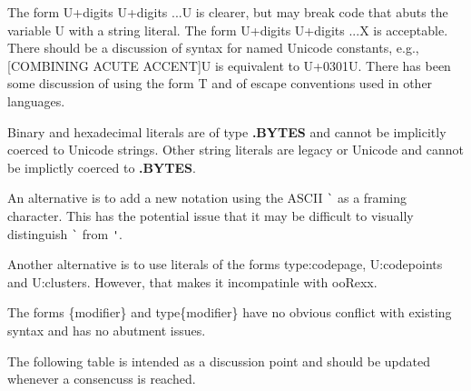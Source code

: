 \documentclass[b4paper]{article}
\begin{document}
The form {\textquotesingle}U+digits U+digits ...{\textquotesingle}U is clearer,
but may break code that abuts the variable U with a string literal.
The form {\textquotesingle}U+digits U+digits ...{\textquotesingle}X is acceptable.
There should be a discussion of syntax for named Unicode constants, e.g.,
{\textquotesingle}[COMBINING ACUTE ACCENT]{\textquotesingle}U is
equivalent to {\textquotesingle}U+0301{\textquotesingle}U.
There has been some discussion of using the form
{\textquotesingle}\textellipsis{\textquotesingle}T and of escape conventions
used in other languages.

Binary and hexadecimal literals are of type \textbf{.BYTES} and cannot be implicitly coerced to Unicode strings.
Other string literals are legacy or Unicode and cannot be implictly coerced to \textbf{.BYTES}.

An alternative is to add a new notation using the ASCII \verb|`| as a
framing character. This has the potential issue that it may be
difficult to visually distinguish  \verb|`| from  \verb|'|.

Another alternative is to use literals of the forms
{\textquotesingle}\textellipsis{\textquotesingle}type:codepage,
{\textquotesingle}\textellipsis{\textquotesingle}U:codepoints and
{\textquotesingle}\textellipsis{\textquotesingle}U:clusters. However,
that makes it incompatinle with ooRexx.

The forms {\textquotesingle}\textellipsis{\textquotesingle}\{modifier\} and
{\textquotesingle}\textellipsis{\textquotesingle}type\{modifier\}
have no obvious conflict with existing syntax and has no abutment issues.

The following table is intended as a discussion point and should be updated whenever a consencuss is reached.
\end{document}
